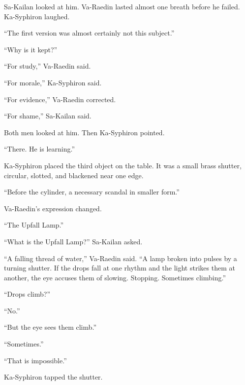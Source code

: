 Sa-Kailan looked at him.
Va-Raedin lasted almost one breath before he failed.
Ka-Syphiron laughed.\par

“The first version was almost certainly not this subject.”\par
“Why is it kept?”\par
“For study,” Va-Raedin said.\par
“For morale,” Ka-Syphiron said.\par
“For evidence,” Va-Raedin corrected.\par
“For shame,” Sa-Kailan said.\par

Both men looked at him.
Then Ka-Syphiron pointed.\par

“There.
He is learning.”\par




Ka-Syphiron placed the third object on the table.
It was a small brass shutter, circular, slotted, and blackened near one edge.\par

“Before the cylinder, a necessary scandal in smaller form.”\par

Va-Raedin’s expression changed.\par

“The Upfall Lamp.”\par

“What is the Upfall Lamp?” Sa-Kailan asked.\par

“A falling thread of water,” Va-Raedin said.
“A lamp broken into pulses by a turning shutter.
If the drops fall at one rhythm and the light strikes them at another, the eye accuses them of slowing.
Stopping.
Sometimes climbing.”\par

“Drops climb?”\par

“No.”\par

“But the eye sees them climb.”\par

“Sometimes.”\par

“That is impossible.”\par

Ka-Syphiron tapped the shutter.\par

